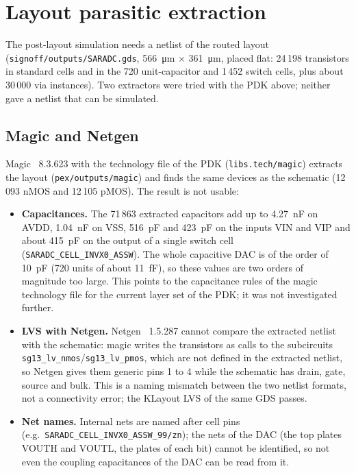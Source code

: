 \documentclass[10pt,a4paper]{article}
\begin{document}
\section{Layout parasitic extraction}
\label{sec:pex}
The post-layout simulation needs a netlist of the routed layout (\texttt{signoff/outputs/SARADC.gds},
\SI{566}{\micro m} $\times$ \SI{361}{\micro m}, placed flat: 24\,198 transistors in standard cells and
in the 720 unit-capacitor and 1\,452 switch cells, plus about 30\,000 via instances). Two extractors were
tried with the PDK above; neither gave a netlist that can be simulated.

\subsection{Magic and Netgen}
Magic~\cite{magic} 8.3.623 with the technology file of the PDK (\texttt{libs.tech/magic}) extracts the
layout (\texttt{pex/outputs/magic}) and finds the same devices as the schematic (12\,093 nMOS and 12\,105
pMOS). The result is not usable:
\begin{itemize}
  \item \textbf{Capacitances.} The 71\,863 extracted capacitors add up to \SI{4.27}{nF} on AVDD,
        \SI{1.04}{nF} on VSS, \SI{516}{pF} and \SI{423}{pF} on the inputs VIN and VIP and about
        \SI{415}{pF} on the output of a single switch cell (\texttt{SARADC\_CELL\_INVX0\_ASSW}). The
        whole capacitive DAC is of the order of \SI{10}{pF} (720 units of about \SI{11}{fF}), so these
        values are two orders of magnitude too large. This points to the capacitance rules of the
        magic technology file for the current layer set of the PDK; it was not investigated further.
  \item \textbf{LVS with Netgen.} Netgen~\cite{netgen} 1.5.287 cannot compare the extracted netlist with
        the schematic: magic writes the transistors as calls to the subcircuits
        \texttt{sg13\_lv\_nmos}/\texttt{sg13\_lv\_pmos}, which are not defined in the extracted netlist,
        so Netgen gives them generic pins 1 to 4 while the schematic has drain, gate, source and bulk.
        This is a naming mismatch between the two netlist formats, not a connectivity error; the KLayout
        LVS of the same GDS passes.
  \item \textbf{Net names.} Internal nets are named after cell pins (e.g.\
        \texttt{SARADC\_CELL\_INVX0\_ASSW\_99/zn}); the nets of the DAC (the top plates VOUTH and
        VOUTL, the plates of each bit) cannot be identified, so not even the coupling capacitances of the
        DAC can be read from it.
\end{itemize}
\end{document}
